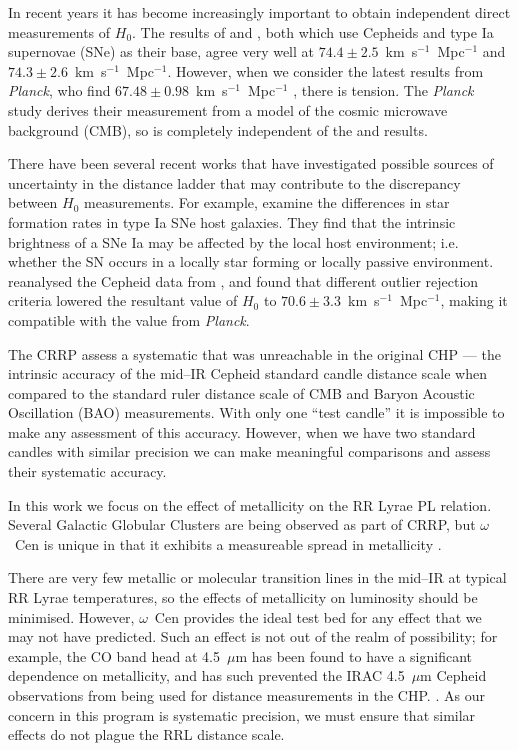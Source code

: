 \documentclass[a4paper,fleqn,usenatbib]{mnras}
\newcommand{\ho}{$H_{0}$\xspace}
\begin{document}
In recent years it has become increasingly important to obtain independent direct measurements of \ho. The results of \citet{2011ApJ...730..119R} and \citet{2012ApJ...758...24F}, both which use Cepheids and type Ia supernovae (SNe) as their base, agree very well at $74.4\pm 2.5$~km~s$^{-1}$~Mpc$^{-1}$ and $74.3\pm2.6$~km~s$^{-1}$~Mpc$^{-1}$. However, when we consider the latest results from {\it Planck}, who find $67.48\pm0.98$~km~s$^{-1}$~Mpc$^{-1}$ \citep{2015arXiv150201589P}, there is tension. The {\it Planck} study derives their measurement from a model of the cosmic microwave background (CMB), so is completely independent of the \citeauthor{2011ApJ...730..119R} and \citeauthor{2012ApJ...758...24F} results. 

There have been several recent works that have investigated possible sources of uncertainty in the distance ladder that may contribute to the discrepancy between \ho measurements. For example, \citet{2015ApJ...802...20R} examine the differences in star formation rates in type Ia SNe host galaxies. They find that the intrinsic brightness of a SNe Ia may be affected by the local host environment; i.e. whether the SN occurs in a locally star forming or locally passive environment. \citet{2014MNRAS.440.1138E} reanalysed the Cepheid data from \citet{2011ApJ...730..119R}, and found that different outlier rejection criteria lowered the resultant value of \ho to $70.6 \pm 3.3$~km~s$^{-1}$~Mpc$^{-1}$, making it compatible with the value from {\it Planck}. 

The CRRP assess a systematic that was unreachable in the original CHP --- the intrinsic accuracy of the mid--IR Cepheid standard candle distance scale when compared to the standard ruler distance scale of CMB and Baryon Acoustic Oscillation (BAO) measurements. With only one ``test candle'' it is impossible to make any assessment of this accuracy. However, when we have two standard candles with similar precision we can make meaningful comparisons and assess their systematic accuracy.

In this work we focus on the effect of metallicity on the RR Lyrae PL relation. Several Galactic Globular Clusters are being observed as part of CRRP, but $\omega$~Cen is unique in that it exhibits a measureable spread in metallicity \citep{1975ApJ...201L..71F, 2007ApJ...663..296V, 2014ApJ...791..107V}.

There are very few metallic or molecular transition lines in the mid--IR at typical RR Lyrae temperatures, so the effects of metallicity on luminosity should be minimised. However, $\omega$~Cen provides the ideal test bed for any effect that we may not have predicted. Such an effect is not out of the realm of possibility; for example, the CO band head at 4.5~$\mu$m has been found to have a significant dependence on metallicity, and has such prevented the IRAC 4.5~$\mu$m Cepheid observations from being used for distance measurements in the CHP. \citep{2011ApJ...743...76S, 2012ApJ...759..146M, 2015arXiv150206995S}. As our concern in this program is systematic precision, we must ensure that similar effects do not plague the RRL distance scale.  
\end{document}
